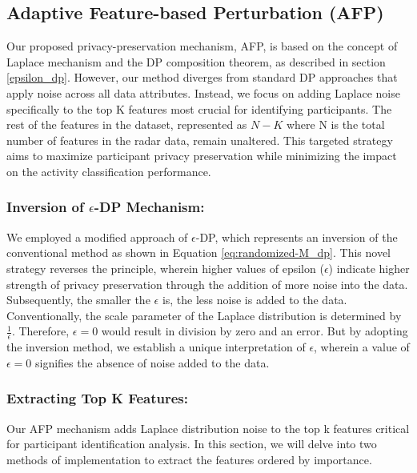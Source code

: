 \documentclass{l4proj}
\begin{document}
\subsection{Adaptive Feature-based Perturbation (AFP)} \label{adaptive_feature-based_perturbation}
Our proposed privacy-preservation mechanism, AFP, is based on the concept of Laplace mechanism and the DP composition theorem, as described in section \ref{epsilon_dp}. However, our method diverges from standard DP approaches that apply noise across all data attributes. Instead, we focus on adding Laplace noise specifically to the top K features most crucial for identifying participants. The rest of the features in the dataset, represented as $N - K$ where N is the total number of features in the radar data, remain unaltered. This targeted strategy aims to maximize participant privacy preservation while minimizing the impact on the activity classification performance.

\subsubsection{Inversion of $\epsilon$-DP Mechanism:}
We employed a modified approach of $\epsilon$-DP, which represents an inversion of the conventional method as shown in Equation \ref{eq:randomized-M_dp}. This novel strategy reverses the principle, wherein higher values of epsilon ($\epsilon$) indicate higher strength of privacy preservation through the addition of more noise into the data. Subsequently, the smaller the $\epsilon$ is, the less noise is added to the data. Conventionally, the scale parameter of the Laplace distribution is determined by $\frac{1}{\epsilon}$. Therefore, $\epsilon=0$ would result in division by zero and an error. But by adopting the inversion method, we establish a unique interpretation of $\epsilon$, wherein a value of $\epsilon=0$ signifies the absence of noise added to the data.

\subsubsection{Extracting Top K Features:}
Our AFP mechanism adds Laplace distribution noise to the top k features critical for participant identification analysis. In this section, we will delve into two methods of implementation to extract the features ordered by importance.
\end{document}
